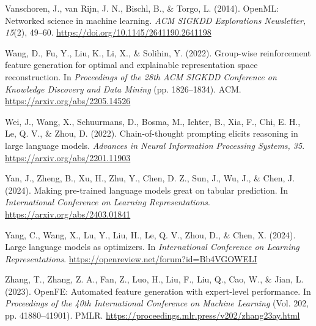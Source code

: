 \documentclass[11pt]{article}
\begin{document}
Vanschoren, J., van Rijn, J. N., Bischl, B., \& Torgo, L. (2014). OpenML: Networked science in
machine learning. \emph{ACM SIGKDD Explorations Newsletter, 15}(2), 49--60.
\url{https://doi.org/10.1145/2641190.2641198}

Wang, D., Fu, Y., Liu, K., Li, X., \& Solihin, Y. (2022). Group-wise reinforcement feature
generation for optimal and explainable representation space reconstruction. In \emph{Proceedings of
the 28th ACM SIGKDD Conference on Knowledge Discovery and Data Mining} (pp. 1826--1834). ACM.
\url{https://arxiv.org/abs/2205.14526}

Wei, J., Wang, X., Schuurmans, D., Bosma, M., Ichter, B., Xia, F., Chi, E. H., Le, Q. V., \& Zhou,
D. (2022). Chain-of-thought prompting elicits reasoning in large language models. \emph{Advances in
Neural Information Processing Systems, 35}. \url{https://arxiv.org/abs/2201.11903}

Yan, J., Zheng, B., Xu, H., Zhu, Y., Chen, D. Z., Sun, J., Wu, J., \& Chen, J. (2024). Making
pre-trained language models great on tabular prediction. In \emph{International Conference on
Learning Representations}. \url{https://arxiv.org/abs/2403.01841}

Yang, C., Wang, X., Lu, Y., Liu, H., Le, Q. V., Zhou, D., \& Chen, X. (2024). Large language models
as optimizers. In \emph{International Conference on Learning Representations}.
\url{https://openreview.net/forum?id=Bb4VGOWELI}

Zhang, T., Zhang, Z. A., Fan, Z., Luo, H., Liu, F., Liu, Q., Cao, W., \& Jian, L. (2023). OpenFE:
Automated feature generation with expert-level performance. In \emph{Proceedings of the 40th
International Conference on Machine Learning} (Vol. 202, pp. 41880--41901). PMLR.
\url{https://proceedings.mlr.press/v202/zhang23ay.html}
\end{document}
